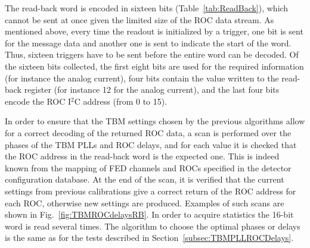 The read-back word is encoded in sixteen bits (Table~\ref{tab:ReadBack}), which cannot be sent at once given the limited size of the ROC data stream.
As mentioned above, every time the readout is initialized by a trigger, one bit is sent for the message data and another one is sent to indicate the start of the word.
Thus, sixteen triggers have to be sent before the entire word can be decoded.
Of the sixteen bits collected, the first eight bits are used for the required information (for instance the analog current),
four bits contain the value written to the read-back register (for instance 12 for the analog current),
and the last four bits encode the ROC I$^2$C address (from 0 to 15).

In order to ensure that the TBM settings chosen by the previous algorithms allow for a correct decoding of the returned ROC data,
a scan is performed over the phases of the TBM PLLs and ROC delays,
and for each value it is checked that the ROC address in the read-back word is the expected one.
This is indeed known from the mapping of FED channels and ROCs specified in the detector configuration database.
At the end of the scan, it is verified that the current settings from previous calibrations give a correct return of the ROC address for each ROC, otherwise new settings are produced.
Examples of such scans are shown in Fig.~\ref{fig:TBMROCdelaysRB}.
In order to acquire statistics the 16-bit word is read several times.
The algorithm to choose the optimal phases or delays is the same as for the tests described in Section~\ref{subsec:TBMPLLROCDelays}.


